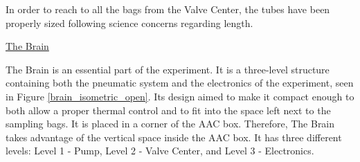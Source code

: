 

In order to reach to all the bags from the Valve Center, the tubes have been properly sized following science concerns regarding length.  


\pagebreak
\underline{The Brain}
\label{subsec:brain}

\smallskip
The Brain is an essential part of the experiment. It is a three-level structure containing both the pneumatic system and the electronics of the experiment, seen in Figure \ref{brain_isometric_open}. Its design aimed to make it compact enough to both allow a proper thermal control and to fit into the space left next to the sampling bags. It is placed in a corner of the AAC box. Therefore, The Brain takes advantage of the vertical space inside the AAC box. It has three different levels: Level 1 - Pump, Level 2 - Valve Center, and Level 3 - Electronics.


